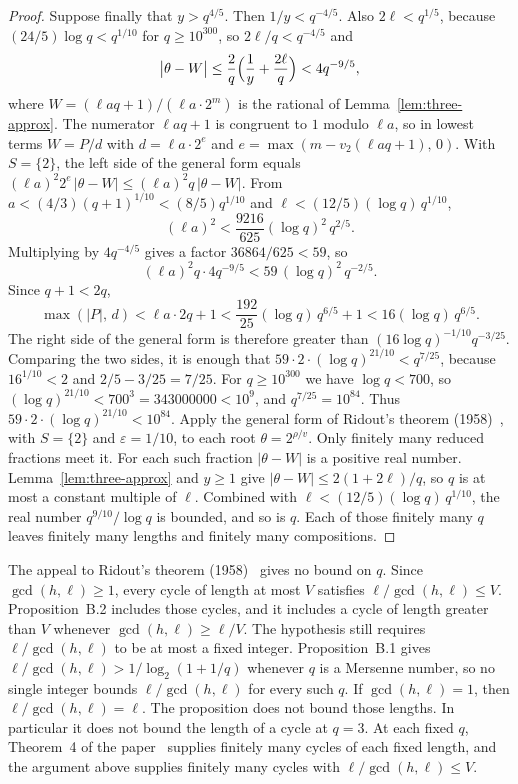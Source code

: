 \documentclass[11pt]{article}
\begin{document}
\begin{proof}
Suppose finally that $y > q^{4/5}$.
Then $1/y < q^{-4/5}$.
Also $2\ell < q^{1/5}$, because $(24/5)\log q < q^{1/10}$ for $q \ge 10^{300}$, so $2\ell/q < q^{-4/5}$ and
\[
\bigl|\theta - W\bigr| \le \frac{2}{q}\Bigl(\frac{1}{y} + \frac{2\ell}{q}\Bigr) < 4q^{-9/5},
\]
where $W = (\ell aq + 1)/(\ell a \cdot 2^m)$ is the rational of Lemma~\ref{lem:three-approx}.
The numerator $\ell aq + 1$ is congruent to $1$ modulo $\ell a$, so in lowest terms $W = P/d$ with $d = \ell a \cdot 2^e$ and $e = \max(m - v_2(\ell aq + 1),\, 0)$.
With $S = \{2\}$, the left side of the general form equals $(\ell a)^2 2^e\, |\theta - W| \le (\ell a)^2 q\, |\theta - W|$.
From $a < (4/3)(q+1)^{1/10} < (8/5)q^{1/10}$ and $\ell < (12/5)(\log q)\, q^{1/10}$,
\[
(\ell a)^2 < \frac{9216}{625}(\log q)^2\, q^{2/5}.
\]
Multiplying by $4q^{-4/5}$ gives a factor $36864/625 < 59$, so
\[
(\ell a)^2 q \cdot 4q^{-9/5} < 59\,(\log q)^2\, q^{-2/5}.
\]
Since $q+1 < 2q$,
\[
\max(|P|,\, d) < \ell a \cdot 2q + 1 < \frac{192}{25}(\log q)\, q^{6/5} + 1 < 16(\log q)\, q^{6/5}.
\]
The right side of the general form is therefore greater than $(16\log q)^{-1/10} q^{-3/25}$.
Comparing the two sides, it is enough that $59 \cdot 2 \cdot (\log q)^{21/10} < q^{7/25}$, because $16^{1/10} < 2$ and $2/5 - 3/25 = 7/25$.
For $q \ge 10^{300}$ we have $\log q < 700$, so $(\log q)^{21/10} < 700^3 = 343000000 < 10^9$, and $q^{7/25} = 10^{84}$.
Thus $59 \cdot 2 \cdot (\log q)^{21/10} < 10^{84}$.
Apply the general form of Ridout's theorem (1958)~\cite{ridout}, with $S = \{2\}$ and $\varepsilon = 1/10$, to each root $\theta = 2^{\rho/v}$.
Only finitely many reduced fractions meet it.
For each such fraction $|\theta - W|$ is a positive real number.
Lemma~\ref{lem:three-approx} and $y \ge 1$ give $|\theta - W| \le 2(1+2\ell)/q$, so $q$ is at most a constant multiple of $\ell$.
Combined with $\ell < (12/5)(\log q)\, q^{1/10}$, the real number $q^{9/10}/\log q$ is bounded, and so is $q$.
Each of those finitely many $q$ leaves finitely many lengths and finitely many compositions.
\end{proof}

The appeal to Ridout's theorem (1958)~\cite{ridout} gives no bound on $q$.
Since $\gcd(h,\ell) \ge 1$, every cycle of length at most $V$ satisfies $\ell/\gcd(h,\ell) \le V$.
Proposition~B.2 includes those cycles, and it includes a cycle of length greater than $V$ whenever $\gcd(h,\ell) \ge \ell/V$.
The hypothesis still requires $\ell/\gcd(h,\ell)$ to be at most a fixed integer.
Proposition~B.1 gives $\ell/\gcd(h,\ell) > 1/\log_2(1+1/q)$ whenever $q$ is a Mersenne number, so no single integer bounds $\ell/\gcd(h,\ell)$ for every such $q$.
If $\gcd(h,\ell) = 1$, then $\ell/\gcd(h,\ell) = \ell$.
The proposition does not bound those lengths.
In particular it does not bound the length of a cycle at $q = 3$.
At each fixed $q$, Theorem~4 of the paper~\cite{hackman-i} supplies finitely many cycles of each fixed length, and the argument above supplies finitely many cycles with $\ell/\gcd(h,\ell) \le V$.
\end{document}
